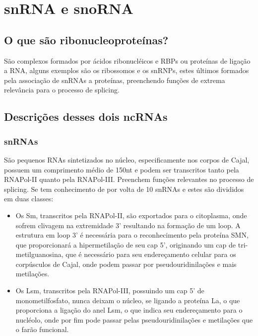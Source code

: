 \documentclass[
]{book}
\begin{document}
\hypertarget{snrna-e-snorna}{%
\chapter{snRNA e snoRNA}\label{snrna-e-snorna}}

\hypertarget{o-que-suxe3o-ribonucleoproteuxednas}{%
\section{O que são ribonucleoproteínas?}\label{o-que-suxe3o-ribonucleoproteuxednas}}

São complexos formados por ácidos ribonucléicos e RBPs ou proteínas de ligação a RNA,
alguns exemplos são os ribossomos e os snRNPs, estes últimos formados pela associação de snRNAs a proteínas, preenchendo funções de extrema relevância para o processo de splicing.

\hypertarget{descriuxe7uxf5es-desses-dois-ncrnas}{%
\section{Descrições desses dois ncRNAs}\label{descriuxe7uxf5es-desses-dois-ncrnas}}

\hypertarget{snrnas}{%
\subsection{snRNAs}\label{snrnas}}

São pequenos RNAs sintetizados no núcleo, especificamente nos corpos de Cajal, possuem um comprimento médio de 150nt e podem ser transcritos tanto pela RNAPol-II quanto pela RNAPol-III. Preenchem funções relevantes no processo de splicing. Se tem conhecimento de por volta de 10 snRNAs e estes são divididos em duas classes:

\begin{itemize}
\item
  Os Sm, transcritos pela RNAPol-II, são exportados para o citoplasma, onde sofrem clivagem na extremidade 3' resultando na formação de um loop. A estrutura em loop 3' é necessária para o reconhecimento pela proteína SMN, que proporcionará a hipermetilação de seu cap 5', originando um cap de tri-metilguanosina, que é necessário para seu endereçamento celular para os corpúsculos de Cajal, onde podem passar por pseudouridinilações e mais metilações.
\item
  Os Lsm, transcritos pela RNAPol-III, possuindo um cap 5' de monometilfosfato, nunca deixam o núcleo, se ligando a proteína La, o que proporciona a ligação do anel Lsm, o que indica seu endereçamento para o nucléolo, onde por fim pode passar pelas pseudouridinilações e metilações que o farão funcional.
\end{itemize}
\end{document}
